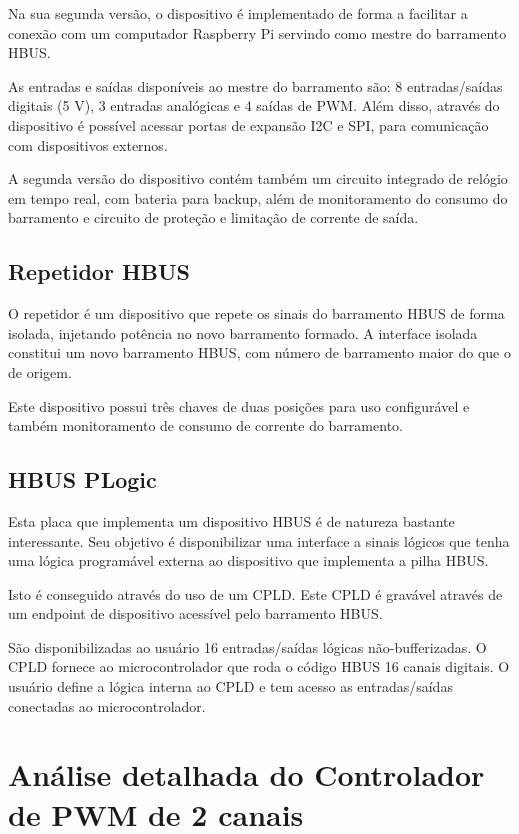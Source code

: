 \documentclass[11pt]{report}
\begin{document}
Na sua segunda versão, o dispositivo é implementado de forma a facilitar a conexão com um computador Raspberry Pi servindo como mestre do barramento HBUS.

As entradas e saídas disponíveis ao mestre do barramento são: 8 entradas/saídas digitais (5 V), 3 entradas analógicas e 4 saídas de PWM. Além disso, através do dispositivo é possível acessar portas de expansão I2C e SPI, para comunicação com dispositivos externos.

A segunda versão do dispositivo contém também um circuito integrado de relógio em tempo real, com bateria para backup, além de monitoramento do consumo do barramento e circuito de proteção e limitação de corrente de saída.

\section{Repetidor HBUS}

O repetidor é um dispositivo que repete os sinais do barramento HBUS de forma isolada, injetando potência no novo barramento formado. A interface isolada constitui um novo barramento HBUS, com número de barramento maior do que o de origem.

Este dispositivo possui três chaves de duas posições para uso configurável e também monitoramento de consumo de corrente do barramento.

\section{HBUS PLogic}

Esta placa que implementa um dispositivo HBUS é de natureza bastante interessante. Seu objetivo é disponibilizar uma interface a sinais lógicos que tenha uma lógica programável externa ao dispositivo que implementa a  pilha HBUS.

Isto é conseguido através do uso de um CPLD. Este CPLD é gravável através de um endpoint de dispositivo acessível pelo barramento HBUS.

São disponibilizadas ao usuário 16 entradas/saídas lógicas não-bufferizadas. O CPLD fornece ao microcontrolador que roda o código HBUS 16 canais digitais. O usuário define a lógica interna ao CPLD e tem acesso as entradas/saídas conectadas ao microcontrolador.


\chapter{Análise detalhada do Controlador de PWM de 2 canais}
\end{document}
